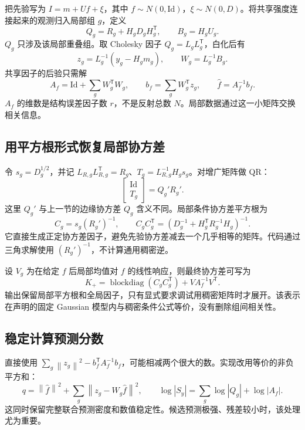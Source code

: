 \documentclass[UTF8,11pt,a4paper,fontset=fandol]{ctexart}
\newcommand{\T}{^{\mathsf T}}
\newcommand{\Id}{\mathrm{Id}}
\newcommand{\norm}[1]{\left\lVert#1\right\rVert}
\begin{document}
把先验写为 $I=m+Uf+\xi$，其中 $f\sim N(0,\Id)$，$\xi\sim N(0,D)$。将共享强度连接起来的观测归入局部组 $g$，定义
\begin{equation}
 Q_g=R_g+H_gD_gH_g\T,\qquad B_g=H_gU_g.
\end{equation}
$Q_g$ 只涉及该局部重叠组。取 Cholesky 因子 $Q_g=L_gL_g\T$，白化后有
\begin{equation}
 z_g=L_g^{-1}(y_g-H_gm_g),\qquad W_g=L_g^{-1}B_g.
\end{equation}
共享因子的后验只需解
\begin{equation}
 A_f=\Id+\sum_g W_g\T W_g,\qquad
 b_f=\sum_g W_g\T z_g,\qquad
 \widehat f=A_f^{-1}b_f.
\end{equation}
$A_f$ 的维数是结构误差因子数 $r$，不是反射总数 $N$。局部数据通过这一小矩阵交换相关信息。

\subsection{用平方根形式恢复局部协方差}

令 $s_g=D_g^{1/2}$，并记 $L_{R,g}L_{R,g}\T=R_g$、$T_g=L_{R,g}^{-1}H_gs_g$。对增广矩阵做 QR：
\begin{equation}
 \begin{bmatrix}\Id\\T_g\end{bmatrix}=Q_g'R_g'.
\end{equation}
这里 $Q_g'$ 与上一节的边缘协方差 $Q_g$ 含义不同。局部条件协方差平方根为
\begin{equation}
 C_g=s_g(R_g')^{-1},\qquad
 C_gC_g\T=(D_g^{-1}+H_g\T R_g^{-1}H_g)^{-1}.
\end{equation}
它直接生成正定协方差因子，避免先验协方差减去一个几乎相等的矩阵。代码通过三角求解使用 $(R_g')^{-1}$，不计算通用稠密逆。

设 $V_g$ 为在给定 $f$ 后局部均值对 $f$ 的线性响应，则最终协方差可写为
\begin{equation}
 K_+=\operatorname{blockdiag}(C_gC_g\T)+VA_f^{-1}V\T.
\end{equation}
输出保留局部平方根和全局因子，只有显式要求调试用稠密矩阵时才展开。该表示在声明的固定 Gaussian 模型内与稠密条件公式等价，没有删除组间相关性。

\subsection{稳定计算预测分数}

直接使用 $\sum_g\norm{z_g}^2-b_f\T A_f^{-1}b_f$，可能相减两个很大的数。实现改用等价的非负平方和：
\begin{equation}
 q=\norm{\widehat f}^2+\sum_g\norm{z_g-W_g\widehat f}^2,
 \qquad
 \log|S_y|=\sum_g\log|Q_g|+\log|A_f|.
\end{equation}
这同时保留完整联合预测密度和数值稳定性。候选预测极强、残差较小时，该处理尤为重要。
\end{document}
